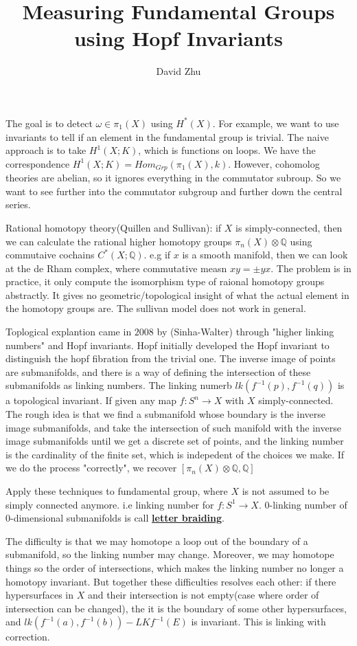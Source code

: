 \documentclass{article}
\title{Measuring Fundamental Groups using Hopf Invariants}
\author{David Zhu}
\theoremstyle{definition}
\theoremstyle{definition}
\theoremstyle{definition}
\theoremstyle{definition}
\theoremstyle{definition}
\theoremstyle{definition}
\theoremstyle{definition}
\begin{document}
\maketitle
 
The goal is to detect $\omega \in \pi_1(X)$ using $H^*(X)$. For example, we want to use invariants to tell if an element in the fundamental group is trivial. The naive approach is to take $H^1(X; K)$, which is functions on loops. We have the correspondence $H^1(X;K)=Hom_{Grp}(\pi_1(X),k)$. However, cohomolog theories are abelian, so it ignores everything in the commutator subroup. So we want to see further into the commutator subgroup and further down the central series.

Rational homotopy theory(Quillen and Sullivan): if $X$ is simply-connected, then we can calculate the rational higher homotopy groups $\pi_n(X)\otimes \mathbb{Q}$ using commutaive cochains $C^*(X; \mathbb{Q})$. e.g if $x$ is a smooth manifold, then we can look at the de Rham complex, where commutative measn $xy=\pm yx$. The problem is in practice, it only compute the isomorphism type of raional homotopy groups abstractly. It gives no geometric/topological insight of what the actual element in the homotopy groups are. The sullivan model does not work in general. 

Toplogical explantion came in $2008$ by (Sinha-Walter) through "higher linking numbers" and Hopf invariants. 
Hopf initially developed the Hopf invariant to distinguish the hopf fibration from the trivial one. The inverse image of points are submanifolds, and there is a way of defining the intersection of these submanifolds as linking numbers. The linking numerb $lk(f^{-1}(p), f ^{-1}(q))$ is a topological invariant. If given any map $f: S^n\to X$ with $X$ simply-connected. The rough idea is that we find a submanifold whose boundary is the inverse image submanifolds, and take the intersection of such manifold with the inverse image submanifolds until we get a discrete set of points, and the linking number is the cardinality of the finite set, which is indepedent of the choices we make. If we do the process "correctly", we recover $[\pi_n(X)\otimes \mathbb{Q}, \mathbb{Q}]$


Apply these techniques to fundamental group, where $X$ is not assumed to be simply connected anymore. i.e linking number for $f: S^1\to X$. $0$-linking number of $0$-dimensional submanifolds is call \underline{\textbf{letter braiding}}. 

The difficulty is that we may homotope a loop out of the boundary of a submanifold, so the linking number may change. Moreover, we may homotope things so the order of intersections, which makes the linking number no longer a homotopy invariant. But together these difficulties resolves each other: if there hypersurfaces in $X$ and their intersection is not empty(case where order of intersection can be changed), the it is the boundary of some other hypersurfaces, and $lk(f^{-1}(a), f ^{-1}(b))-LKf^{-1}(E)$ is invariant. This is linking with correction. 
\end{document}
